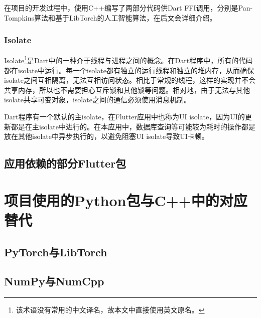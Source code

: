 在项目的开发过程中，使用C++编写了两部分代码供Dart FFI调用，分别是Pan-Tompkins算法和基于LibTorch的人工智能算法，在后文会详细介绍。

\subsubsection{Isolate}\label{subsubsec:isolate}

Isolate\footnote{该术语没有常用的中文译名，故本文中直接使用英文原名。}是Dart中的一种介于线程与进程之间的概念。在Dart程序中，所有的代码都在isolate中运行。每一个isolate都有独立的运行线程和独立的堆内存，从而确保isolate之间互相隔离，无法互相访问状态。相比于常规的线程，这样的实现并不会共享内存，所以也不需要担心互斥锁和其他锁等问题。相对地，由于无法与其他isolate共享可变对象，isolate之间的通信必须使用消息机制。

Dart程序有一个默认的主isolate，在Flutter应用中也称为UI isolate，因为UI的更新都是在主isolate中进行的。在本应用中，数据库查询等可能较为耗时的操作都是放在其他isolate中异步执行的，以避免阻塞UI isolate导致UI卡顿。

\subsection{应用依赖的部分Flutter包}\label{subsec:flutter-packages}



\section{项目使用的Python包与C++中的对应替代}\label{sec:python-cpp-packages}


\subsection{PyTorch与LibTorch}\label{subsec:pytorch-libtorch}




\subsection{NumPy与NumCpp}\label{subsec:numpy-numcpp}

